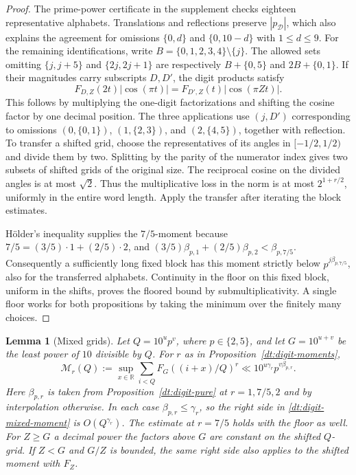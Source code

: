 \documentclass[11pt,a4paper]{article}
\theoremstyle{paperplain}
\newtheorem{lemma}[theorem]{Lemma}
\numberwithin{equation}{section}
\begin{document}
\begin{proof}
The prime-power certificate in the supplement checks eighteen representative
alphabets. Translations and reflections preserve \(|p_{\mathcal D}|\),
which also explains the agreement for omissions \(\{0,d\}\)
and \(\{0,10-d\}\) with \(1\le d\le9\). For the remaining
identifications, write \(B=\{0,1,2,3,4\}\setminus\{j\}\).
The allowed sets omitting \(\{j,j+5\}\) and \(\{2j,2j+1\}\)
are respectively \(B+\{0,5\}\) and \(2B+\{0,1\}\). If their
magnitudes carry subscripts \(D,D'\), the digit products satisfy
\[
 F_{D,Z}(2t)|\cos(\pi t)|=F_{D',Z}(t)|\cos(\pi Zt)|.
\]
This follows by multiplying the one-digit factorizations
and shifting the cosine factor by one decimal position.
The three applications use \((j,D')\) corresponding to
omissions \((0,\{0,1\})\), \((1,\{2,3\})\), and
\((2,\{4,5\})\), together with reflection. To transfer a
shifted grid, choose the representatives of its angles in
\([-1/2,1/2)\) and divide them by two. Splitting by the
parity of the numerator index gives two subsets of shifted
grids of the original size. The reciprocal cosine on the
divided angles is at most \(\sqrt2\). Thus the multiplicative
loss in the norm is at most \(2^{1+r/2}\), uniformly in the
entire word length. Apply the transfer after iterating
the block estimates.

Hölder's inequality supplies the \(7/5\)-moment because
\(7/5=(3/5)\cdot1+(2/5)\cdot2\), and
\((3/5)\beta_{p,1}+(2/5)\beta_{p,2}<\beta_{p,7/5}\).
Consequently a sufficiently long fixed block has this
moment strictly below \(p^{j\beta_{p,7/5}}\), also for the
transferred alphabets. Continuity in the floor on this
fixed block, uniform in the shifts, proves the floored
bound by submultiplicativity. A single floor works for both
propositions by taking the minimum over the finitely many
choices.
\end{proof}

\begin{lemma}[Mixed grids]\label{dt:digit-mixed}
Let \(Q=10^u p^v\), where \(p\in\{2,5\}\), and let \(G=10^{u+v}\)
be the least power of \(10\) divisible by \(Q\). For \(r\) as in
Proposition~\ref{dt:digit-moments},
\begin{equation}\label{dt:digit-mixed-moment}
 \mathcal M_r(Q)
 :=\sup_{x\in\mathbb R}\sum_{i<Q} F_G((i+x)/Q)^r
 \ll10^{u\gamma_r}p^{v\beta_{p,r}} .
\end{equation}
Here \(\beta_{p,r}\) is taken from Proposition~\ref{dt:digit-pure}
at \(r=1,7/5,2\) and by interpolation otherwise. In each case
\(\beta_{p,r}\le\gamma_r\), so the right side in
\eqref{dt:digit-mixed-moment} is \(O(Q^{\gamma_r})\).
The estimate at \(r=7/5\) holds with the floor as well.
For \(Z\ge G\) a decimal power the factors above \(G\)
are constant on the shifted \(Q\)-grid. If \(Z<G\) and \(G/Z\)
is bounded, the same right side also applies to the shifted
moment with \(F_Z\).
\end{lemma}
\end{document}
